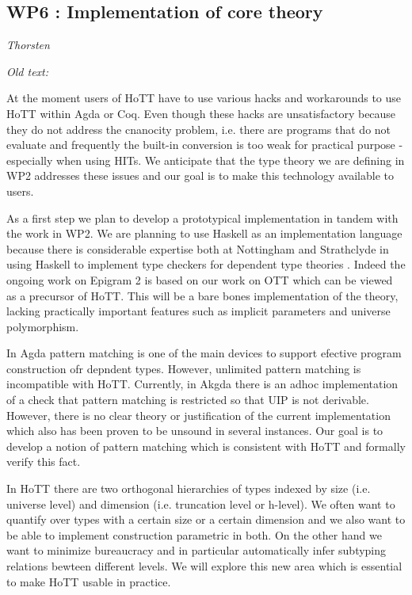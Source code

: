 \documentclass[twocolumn,a4paper,11pt]{article}
\begin{document}
\subsection*{WP6 : Implementation of core theory} 

\emph{Thorsten}

\emph{Old text:}

At the moment users of HoTT have to use various hacks and workarounds
to use HoTT within Agda or Coq. Even though these hacks are
unsatisfactory because they do not address the cnanocity problem,
i.e. there are programs that do not evaluate and frequently the
built-in conversion is too weak for practical purpose - especially
when using HITs. We anticipate that the type theory we are defining in
WP2 addresses these issues and our goal is to make this technology
available to users.

As a first step we plan to develop a prototypical implementation in
tandem with the work in WP2. We are planning to use Haskell as an
implementation language because there is considerable expertise both
at Nottingham and Strathclyde in using Haskell to implement type
checkers for dependent type theories \cite{epigram,easy,pisigma}.
Indeed the ongoing work on Epigram 2 is based on our work on OTT which
can be viewed as a precursor of HoTT.
This will be a bare bones implementation of the theory, lacking
practically important features such as implicit parameters and
universe polymorphism.

In Agda pattern matching is one of the main devices to support
efective program construction ofr depndent types. However, unlimited
pattern matching is incompatible with HoTT. Currently, in Akgda there
is an adhoc implementation of a check that pattern matching is
restricted so that UIP is not derivable. However, there is no clear
theory or justification of the current implementation which also has
been proven to be unsound in several instances. Our goal is to develop
a notion of pattern matching which is consistent with HoTT and
formally verify this fact. 

In HoTT there are two orthogonal hierarchies of types indexed by size
(i.e. universe level) and dimension (i.e. truncation level or h-level). We often
want to quantify over types with a certain size or a certain dimension
and we also want to be able to implement construction parametric in
both. On the other hand we want to minimize bureaucracy and in
particular automatically infer subtyping relations bewteen different
levels. We will explore this new area which is essential to make HoTT
usable in practice.
\end{document}
